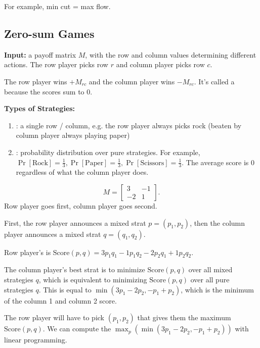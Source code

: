 \documentclass{article}
\begin{document}
For example, min cut = max flow.

\subsection{Zero-sum Games}

\textbf{Input:} a payoff matrix $M$, with the row and column values determining different actions. The row player picks row $r$ and column player picks row $c$. 

The row player wins $+M_{rc}$ and the column player wins $-M_{rc}$. It's called a  because the scores sum to $0$.

\textbf{Types of Strategies:}
\begin{enumerate}
    \item {}: a single row / column, e.g. the row player always picks rock (beaten by column player always playing paper)
    \item {}: probability distribution over pure strategies. For example, $\Pr[\mathrm{Rock}] = \frac{1}{3}, \Pr[\mathrm{Paper}] = \frac{1}{3}, \Pr[\mathrm{Scissors}] = \frac{1}{3}$. The average score is $0$ regardless of what the column player does.
\end{enumerate}

\begin{ex}[Game 1]
    \[M = \begin{bmatrix}3 & -1 \\ -2 & 1 \end{bmatrix}.\] Row player goes first, column player goes second.
\end{ex}

First, the row player announces a mixed strat $p = (p_1, p_2)$, then the column player announces a mixed strat $q = (q_1, q_2)$.

\begin{defn}
    Row player's  is $\mathrm{Score}(p, q) = 3p_1q_1 - 1p_1q_2 -2p_2q_1 + 1p_2q_2$.
\end{defn}

The column player's best strat is to minimize $\mathrm{Score}(p, q)$ over all mixed strategies $q$, which is equivalent to minimizing $\mathrm{Score}(p, q)$ over all pure strategies $q$. This is equal to $\min(3p_1 - 2p_2, -p_1 + p_2)$, which is the minimum of the column 1 and column 2 score.

The row player will have to pick $(p_1, p_2)$ that gives them the maximum $\mathrm{Score}(p, q)$. We can compute the $\max_p(\min(3p_1 - 2p_2, -p_1 + p_2))$ with linear programming.
\end{document}
